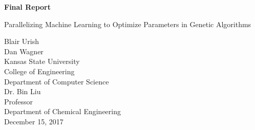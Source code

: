 \documentclass[letterpaper, 12pt]{article}
\begin{document}
\begin{titlepage}
\centering
	\vspace*{5.75cm}
	{\huge\bfseries Final Report\par}
	{\large Parallelizing Machine Learning to Optimize Parameters in Genetic Algorithms\par}
	\vspace{2cm}
	Blair Urish\\
	Dan Wagner\\
	Kansas State University\\
	College of Engineering\\
	Department of Computer Science\\
	\vspace{1cm}
	Dr. Bin Liu\\
	Professor\\
	Department of Chemical Engineering\\
	\vspace{1cm}
	December 15, 2017
\end{titlepage}

\begin{abstract}
\thispagestyle{plain}
\begin{flushleft}
	It is difficult for traditional materials to have some desirable traits that often conflict with one another.  Hybrid materials are crafted to solve this, but the compounds are difficult to identify.  Using machine learning and genetic algorithms to locate the traits of these compounds has had success but is inefficient in computing power.  Thus, we propose an approach to parallelize the process by distributing the work across several nodes in a master-slave relationship.  This method will allow the computation time to be spread across chunks of data, and result in an overall lower run time.
\end{flushleft}
\end{abstract}
\end{document}

